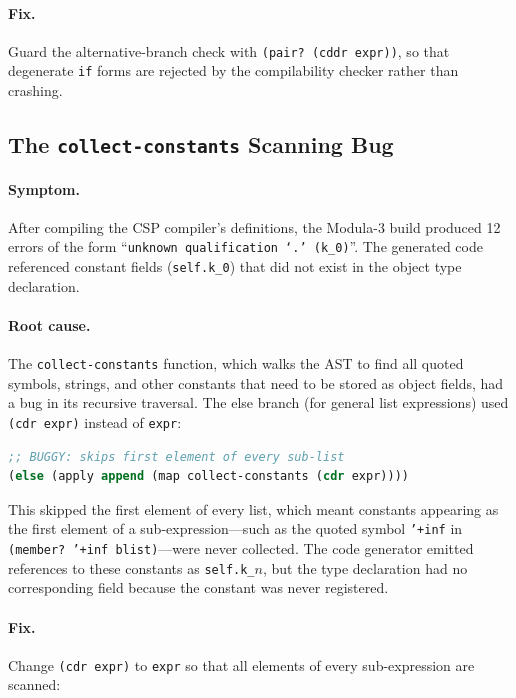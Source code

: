 \documentclass[12pt]{report}
\begin{document}
\paragraph{Fix.}
Guard the alternative-branch check with \texttt{(pair?\ (cddr expr))},
so that degenerate \texttt{if} forms are rejected by the compilability
checker rather than crashing.

\subsection{The \texttt{collect-constants} Scanning Bug}
\label{sec:bug-constants}

\paragraph{Symptom.}
After compiling the CSP compiler's definitions, the Modula-3
build produced 12 errors of the form ``\texttt{unknown qualification
`.'\,(k\_0)}''.  The generated code referenced constant fields
(\texttt{self.k\_0}) that did not exist in the object type declaration.

\paragraph{Root cause.}
The \texttt{collect-constants} function, which walks the AST to find
all quoted symbols, strings, and other constants that need to be
stored as object fields, had a bug in its recursive traversal.
The else branch (for general list expressions) used
\texttt{(cdr expr)} instead of \texttt{expr}:

\begin{lstlisting}[language=Scheme]
;; BUGGY: skips first element of every sub-list
(else (apply append (map collect-constants (cdr expr))))
\end{lstlisting}

This skipped the first element of every list, which meant constants
appearing as the first element of a sub-expression---such as the
quoted symbol \texttt{'+inf} in \texttt{(member?\ '+inf blist)}---were
never collected.  The code generator emitted references to these
constants as \texttt{self.k\_$n$}, but the type declaration had no
corresponding field because the constant was never registered.

\paragraph{Fix.}
Change \texttt{(cdr expr)} to \texttt{expr} so that all elements
of every sub-expression are scanned:
\end{document}
